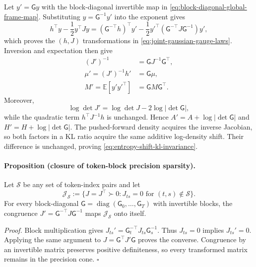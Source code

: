 Let $y'=\mathsf G y$ with the block-diagonal invertible map in \cref{eq:block-diagonal-global-frame-map}.  Substituting $y=\mathsf G^{-1}y'$ into the exponent gives
\begin{equation}
h^\top y-\frac12y^\top Jy
=(\mathsf G^{-\top}h)^\top y'
-\frac12y'^\top
(\mathsf G^{-\top}J\mathsf G^{-1})y',
\label{eq:gauge-transformed-information-exponent}
\end{equation}
which proves the $(h,J)$ transformations in \cref{eq:joint-gaussian-gauge-laws}.  Inversion and expectation then give
\begin{equation}
\begin{aligned}
(J')^{-1}
&=\mathsf GJ^{-1}\mathsf G^\top,\\
\mu'=(J')^{-1}h'
&=\mathsf G\mu,\\
M'=\mathbb E[y'y'^\top]
&=\mathsf GM\mathsf G^\top.
\end{aligned}
\label{eq:gauge-transformed-moment-proof}
\end{equation}
Moreover,
\begin{equation}
\log\det J'
=\log\det J-2\log|\det\mathsf G|,
\label{eq:gauge-precision-logdet-shift}
\end{equation}
while the quadratic term $h^\top J^{-1}h$ is unchanged.  Hence $A'=A+\log|\det\mathsf G|$ and $H'=H+\log|\det\mathsf G|$.  The pushed-forward density acquires the inverse Jacobian, so both factors in a KL ratio acquire the same additive log-density shift.  Their difference is unchanged, proving \cref{eq:entropy-shift-kl-invariance}.

\paragraph{Proposition (closure of token-block precision sparsity).}
Let $\mathcal S$ be any set of token-index pairs and let
\begin{equation}
\mathcal J_{\mathcal S}
:=\{J=J^\top\succ0:J_{ts}=0\text{ for }(t,s)\notin\mathcal S\}.
\label{eq:token-block-sparse-precision-family}
\end{equation}
For every block-diagonal $\mathsf G=\operatorname{diag}(\mathsf G_0,\ldots,\mathsf G_T)$ with invertible blocks, the congruence $J'=\mathsf G^{-\top}J\mathsf G^{-1}$ maps $\mathcal J_{\mathcal S}$ onto itself.

\emph{Proof.}
Block multiplication gives $J_{ts}'=\mathsf G_t^{-\top}J_{ts}\mathsf G_s^{-1}$.  Thus $J_{ts}=0$ implies $J_{ts}'=0$.  Applying the same argument to $J=\mathsf G^\top J'\mathsf G$ proves the converse.  Congruence by an invertible matrix preserves positive definiteness, so every transformed matrix remains in the precision cone.  \hfill$\square$

